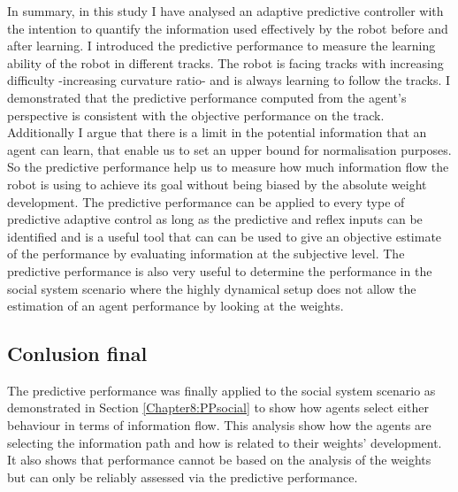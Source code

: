 In summary, in this study I have analysed an adaptive predictive controller
with the intention to quantify the information used effectively by the robot 
before and after learning.
I introduced the predictive performance to measure the learning ability
of the robot in different tracks.
The robot is facing tracks with increasing difficulty -increasing curvature ratio- 
and is always learning to follow the tracks.
I demonstrated that the predictive performance computed from the agent's 
perspective is consistent with the objective performance on the track.
Additionally I argue that there is a limit in the potential information that an agent can learn,
that enable us to set an upper bound for normalisation purposes.
So the predictive performance help us to measure how much information flow 
the robot is using to achieve its goal without being biased by the absolute weight development.
The predictive performance can be applied to every type of predictive adaptive control 
as long as the predictive and reflex inputs can be identified and is a useful tool 
that can can be used to give an objective estimate of the performance by evaluating information at the subjective level.
The predictive performance is also very useful to determine the performance in the
social system scenario where the highly dynamical setup does not allow the estimation
of an agent performance by looking at the weights.

\subsection{Conlusion final}
The predictive performance was finally applied to the social system scenario
as demonstrated in Section \ref{Chapter8:PPsocial} to show how agents
select either behaviour in terms of information flow.
This analysis show how the agents are selecting the information path and 
how is related to their weights' development.
It also shows that performance cannot be based on the analysis of the weights
but can only be reliably assessed via the predictive performance.